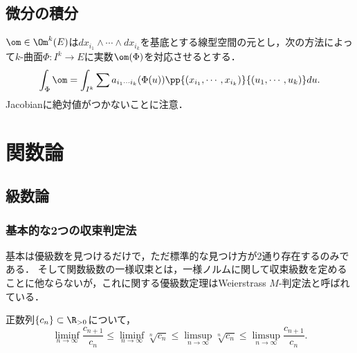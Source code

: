 \documentclass[uplatex, dvipdfmx]{jsreport}
\begin{document}
\section{微分の積分}

\begin{definition}
    $\om\in\Om^k(E)$は$dx_{i_1}\wedge\cdots\wedge dx_{i_k}$を基底とする線型空間の元とし，次の方法によって$k$-曲面$\Phi:I^k\to E$に実数$\om(\Phi)$を対応させるとする．
    \[\int_\Phi\om=\int_{I^k}\sum a_{i_1\cdots i_k}(\Phi(u))\pp{(x_{i_1},\cdots,x_{i_k})}{(u_1,\cdots,u_k)}du.\]
    Jacobianに絶対値がつかないことに注意．
\end{definition}

\begin{definition}
    
\end{definition}

\chapter{関数論}

\section{級数論}

\subsection{基本的な2つの収束判定法}

\begin{tcolorbox}[colframe=ForestGreen, colback=ForestGreen!10!white,breakable,colbacktitle=ForestGreen!40!white,coltitle=black,fonttitle=\bfseries\sffamily,
title=]
    基本は優級数を見つけるだけで，ただ標準的な見つけ方が2通り存在するのみである．
    そして関数級数の一様収束とは，一様ノルムに関して収束級数を定めることに他ならないが，これに関する優級数定理はWeierstrass $M$-判定法と呼ばれている．
\end{tcolorbox}

\begin{theorem}
    正数列$\{c_n\}\subset\R_{>0}$について，
    \[\liminf_{n\to\infty}\frac{c_{n+1}}{c_n}\le\liminf_{n\to\infty}\sqrt[n]{c_n}\le\limsup_{n\to\infty}\sqrt[n]{c_n}\le\limsup_{n\to\infty}\frac{c_{n+1}}{c_n}.\]
\end{theorem}
\end{document}
